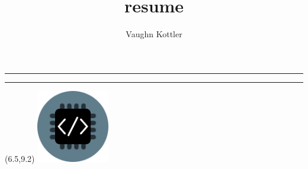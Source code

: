 \documentclass[letterpaper,10pt]{article}
\title{resume}
\author{Vaughn Kottler}
\newcommand{\HR}{{\centering\noindent\rule{7.75in}{0.5pt}}\break}
\begin{document}
%
\noindent
\noindent
\noindent
\HR

\noindent
\noindent
\noindent
\HR
%
\begin{textblock}{1.25}(6.5,9.2)
\includegraphics[width=1.25in,natwidth=100,natheight=100]{im/logo_circular_510.png}
\end{textblock}
\noindent

\end{document}
